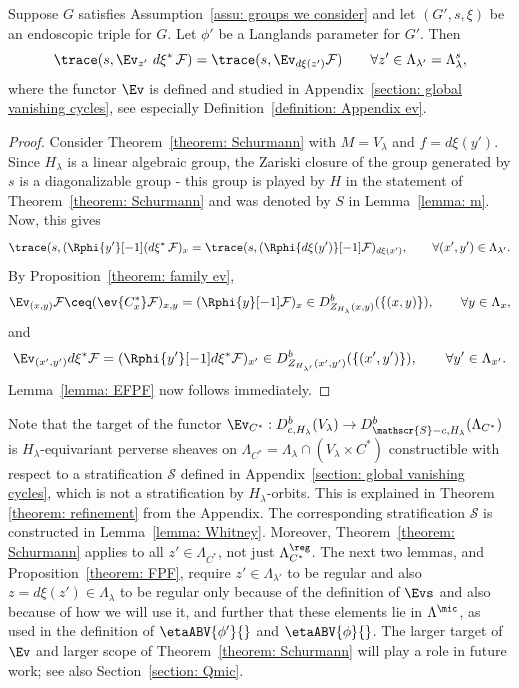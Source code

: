 \documentclass[11pt,letterpaper]{amsart}
\numberwithin{equation}{section}
\begin{document}
\begin{lemma}
\label{lemma: EFPF}
Suppose $G$ satisfies Assumption~\ref{assu: groups we consider} and let $(G',s,\xi)$ be an endoscopic triple for $G$.
Let $\phi'$ be a Langlands parameter for $G'$.
Then
\[
\trace({s},\Ev_{z'}\ d\xi^*\, \mathcal{F})
=
\trace({s},\Ev_{d\xi(z')} \mathcal{F})
\qquad\forall
z'\in \Lambda_{\lambda'}= \Lambda^s_{\lambda},
\]
where the functor $\Ev$ is defined and studied in Appendix~\ref{section: global vanishing cycles}, see especially Definition~\ref{definition: Appendix ev}.
\end{lemma}

\begin{proof}   
Consider Theorem~\ref{theorem: Schurmann} with $M = V_{\lambda}$ and $f=d\xi(y')$.
Since $H_\lambda$ is a linear algebraic group, the Zariski closure of the group generated by $s$ is a diagonalizable group - this group is played by $H$ in the statement of Theorem~\ref{theorem: Schurmann} and was denoted by $S$ in Lemma~\ref{lemma: m}.
Now, this gives
\[ \trace({s},(\Rphi{y'}[-1](d\xi^*\, \mathcal{F})_x
=
\trace({s},(\Rphi{d\xi(y')}[-1] \mathcal{F})_{d\xi(x')},
\qquad
\forall (x',y')\in \Lambda_{\lambda'}.
\]
By Proposition~\ref{theorem: family ev},
\[
\Ev_{(x,y)}\mathcal{F} 
\ceq 
(\ev{C^*_x}\mathcal{F})_{x,y}
=
(\Rphi{y}[-1]\mathcal{F})_x \in D^b_{Z_{H_\lambda}(x,y)}(\{ (x,y)\}),
\qquad
\forall y\in \Lambda_{x},
\]
and
\[
\Ev_{(x',y')}d\xi^* \mathcal{F} 
=
(\Rphi{y'}[-1]d\xi^*\mathcal{F})_{x'} \in D^b_{Z_{H_{\lambda'}}(x',y')}(\{ (x',y')\}),
\qquad
\forall y'\in \Lambda_{x'}.
\]
Lemma~\ref{lemma: EFPF} now follows immediately.
\end{proof}

\begin{remark}
  Note that the target of the functor $\Ev_{C^*}: D^b_{c,H_\lambda}(V_\lambda) \to D^b_{\mathscr{S}-c,H_\lambda}(\Lambda_{C^*})$ is $H_\lambda$-equivariant perverse sheaves on $\Lambda_{C^*} = \Lambda_\lambda \cap (V_\lambda\times C^*)$ constructible  with respect to a stratification $ \mathscr{S}$ defined in Appendix~\ref{section: global vanishing cycles}, which is not a stratification by $H_\lambda$-orbits. 
  This is explained in Theorem \ref{theorem: refinement} from the Appendix. The corresponding stratification $\mathscr{S}$ is constructed in Lemma~\ref{lemma: Whitney}.  
  Moreover, Theorem~\ref{theorem: Schurmann} applies to all $z'\in \Lambda_{C^*}$, not just $\Lambda^\reg_{C^*}$. 
  The next two lemmas, and Proposition~\ref{theorem: FPF}, require $z'\in \Lambda_{\lambda'}$ to be regular and also $z = d\xi(z')\in \Lambda_{\lambda}$ to be regular only because of the definition of $\Evs$ and also because of how we will use it, and further that these elements lie in $\Lambda^\mic$, as used in the definition of $\etaABV{\phi'}{}$ and $\etaABV{\phi}{}$. The larger target of $\Ev$ and larger scope of Theorem~\ref{theorem: Schurmann} will play a role in future work; see also Section~\ref{section: Qmic}.
\end{remark}
\end{document}
